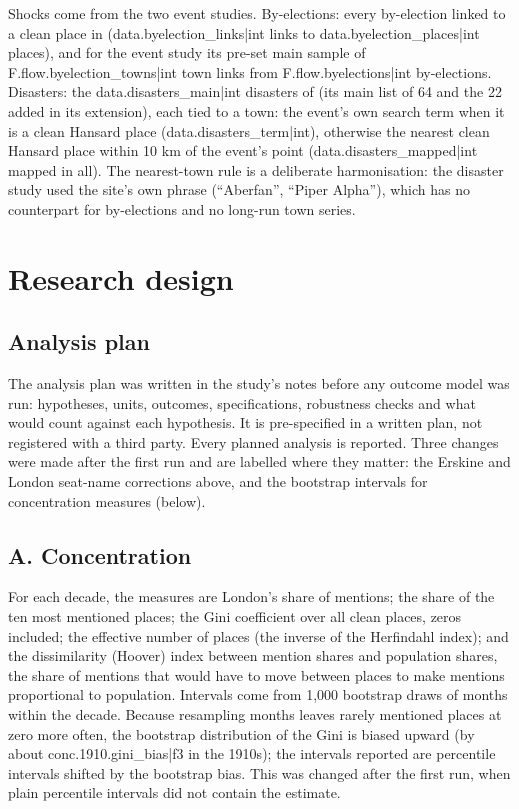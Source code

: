 \documentclass[11pt,a4paper]{article}
\begin{document}
Shocks come from the two event studies. By-elections: every by-election linked to a clean place in \citet{hotham2026c} ({{data.byelection_links|int}} links to {{data.byelection_places|int}} places), and for the event study its pre-set main sample of {{F.flow.byelection_towns|int}} town links from {{F.flow.byelections|int}} by-elections. Disasters: the {{data.disasters_main|int}} disasters of \citet{hotham2026d} (its main list of 64 and the 22 added in its extension), each tied to a town: the event's own search term when it is a clean Hansard place ({{data.disasters_term|int}}), otherwise the nearest clean Hansard place within 10 km of the event's point ({{data.disasters_mapped|int}} mapped in all). The nearest-town rule is a deliberate harmonisation: the disaster study used the site's own phrase (``Aberfan'', ``Piper Alpha''), which has no counterpart for by-elections and no long-run town series.

\section{Research design}\label{sec:design}
\subsection{Analysis plan}
The analysis plan was written in the study's notes before any outcome model was run: hypotheses, units, outcomes, specifications, robustness checks and what would count against each hypothesis. It is pre-specified in a written plan, not registered with a third party. Every planned analysis is reported. Three changes were made after the first run and are labelled where they matter: the Erskine and London seat-name corrections above, and the bootstrap intervals for concentration measures (below).

\subsection{A. Concentration}
For each decade, the measures are London's share of mentions; the share of the ten most mentioned places; the Gini coefficient over all clean places, zeros included; the effective number of places (the inverse of the Herfindahl index); and the dissimilarity (Hoover) index between mention shares and population shares, the share of mentions that would have to move between places to make mentions proportional to population. Intervals come from 1,000 bootstrap draws of months within the decade. Because resampling months leaves rarely mentioned places at zero more often, the bootstrap distribution of the Gini is biased upward (by about {{conc.1910.gini_bias|f3}} in the 1910s); the intervals reported are percentile intervals shifted by the bootstrap bias. This was changed after the first run, when plain percentile intervals did not contain the estimate.
\end{document}
